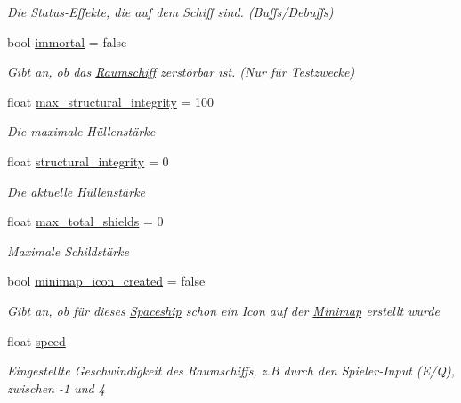 \begin{DoxyCompactItemize}
\begin{DoxyCompactList}\small\item\em Die Status-\/\+Effekte, die auf dem Schiff sind. (Buffs/\+Debuffs) \end{DoxyCompactList}\item 
bool \hyperlink{class_spaceship_a6a17ebe141b503299caf808301bf60aa}{immortal} = false
\begin{DoxyCompactList}\small\item\em Gibt an, ob das \hyperlink{class_raumschiff}{Raumschiff} zerstörbar ist. (Nur für Testzwecke) \end{DoxyCompactList}\item 
float \hyperlink{class_spaceship_a2ecf9e8c9ba5fbc7b53f731b8c364e20}{max\+\_\+structural\+\_\+integrity} = 100
\begin{DoxyCompactList}\small\item\em Die maximale Hüllenstärke \end{DoxyCompactList}\item 
float \hyperlink{class_spaceship_a7ac37ce79a081b8bc4cdedf741be9043}{structural\+\_\+integrity} = 0
\begin{DoxyCompactList}\small\item\em Die aktuelle Hüllenstärke \end{DoxyCompactList}\item 
float \hyperlink{class_spaceship_a96369ccf86f31837d7d7ae63636e780f}{max\+\_\+total\+\_\+shields} = 0
\begin{DoxyCompactList}\small\item\em Maximale Schildstärke \end{DoxyCompactList}\item 
bool \hyperlink{class_spaceship_ab3545f7f8a0bc4e106c58ee829a8c195}{minimap\+\_\+icon\+\_\+created} = false
\begin{DoxyCompactList}\small\item\em Gibt an, ob für dieses \hyperlink{class_spaceship}{Spaceship} schon ein Icon auf der \hyperlink{class_minimap}{Minimap} erstellt wurde \end{DoxyCompactList}\item 
float \hyperlink{class_spaceship_a66af2928c7df3d1050d5a730a179b922}{speed}
\begin{DoxyCompactList}\small\item\em Eingestellte Geschwindigkeit des Raumschiffs, z.\+B durch den Spieler-\/\+Input (E/Q), zwischen -\/1 und 4 \end{DoxyCompactList}\item 

\end{DoxyCompactItemize}
